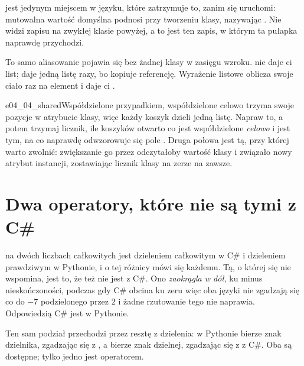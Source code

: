 \noindent
{} jest jedynym miejscem w języku, które zatrzymuje to,
zanim się uruchomi: mutowalna wartość domyślna podnosi 
przy tworzeniu klasy, nazywając . Nie widzi zapisu
na zwykłej klasie powyżej, a to jest ten zapis, w którym ta pułapka
naprawdę przychodzi.

To samo aliasowanie pojawia się bez żadnej klasy w zasięgu wzroku.
 nie daje ci  list; daje jedną listę  razy,
bo \code{*} kopiuje referencję. Wyrażenie listowe oblicza swoje ciało raz
na element i daje ci .


\begin{exercise}{e04_04_shared}{Współdzielone przypadkiem, współdzielone celowo}
 trzyma swoje pozycje w atrybucie klasy, więc każdy koszyk
dzieli jedną listę. Napraw to, a potem trzymaj licznik, ile koszyków
otwarto \dash{} co jest współdzielone \emph{celowo} i jest tym, na co
naprawdę odwzorowuje się pole . Druga połowa jest tą, przy
której warto zwolnić: zwiększanie go przez  odczytałoby wartość
klasy i związało nowy atrybut instancji, zostawiając licznik klasy na
zerze na zawsze.
\end{exercise}

\section{Dwa operatory, które nie są tymi z C\#}
\label{sec:ch04-arithmetic}

\code{/} na dwóch liczbach całkowitych jest dzieleniem całkowitym w C\# i
dzieleniem prawdziwym w Pythonie, i o tej różnicy mówi się każdemu. Tą, o
której się nie wspomina, jest to, że \code{//} też nie jest \code{/} z
C\#. Ono \emph{zaokrągla w dół}, ku minus nieskończoności, podczas gdy
C\# obcina ku zeru \dash{} więc oba języki nie zgadzają się co do $-7$
podzielonego przez $2$ i żadne rzutowanie tego nie naprawia. Odpowiedzią
C\# jest  w Pythonie.



\noindent
Ten sam podział przechodzi przez resztę z dzielenia: \code{\%} w Pythonie
bierze znak dzielnika, zgadzając się z \code{//}, a  bierze
znak dzielnej, zgadzając się z \code{\%} z C\#. Oba są dostępne; tylko
jedno jest operatorem.

